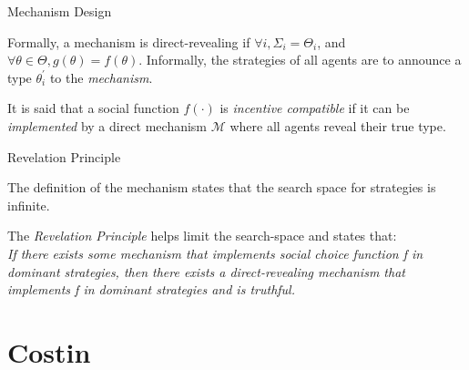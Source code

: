\documentclass{beamer}
\begin{document}
\begin{frame}{Mechanism Design}

    \pause
    Formally, a mechanism is direct-revealing if $\forall i,
    \Sigma_i=\Theta_i$, and $\forall \theta \in \Theta, g(\theta)=f(\theta)$.
    Informally, the strategies of all agents are to announce a type
    $\theta_i^{'}$ to the \emph{mechanism}.\pause

    \vspace{5mm}

    It is said that a social function
    $f(\cdot)$ is \emph{incentive compatible} if it can be \emph{implemented}
    by a direct mechanism $\mathcal{M}$ where all agents reveal their true type.
\end{frame}

\begin{frame}{Revelation Principle}

    \pause
    The definition of the mechanism states that the search space for strategies
    is infinite.\pause
    \vspace{5mm}

    The \emph{Revelation Principle} helps limit the search-space and states that:\\
    \pause
    \vspace{3mm}
    \emph{If there exists some mechanism that implements social choice
    function f in dominant strategies, then there exists a direct-revealing
    mechanism that implements f in dominant strategies and is truthful.}

\end{frame}

\section{Costin}
\end{document}
